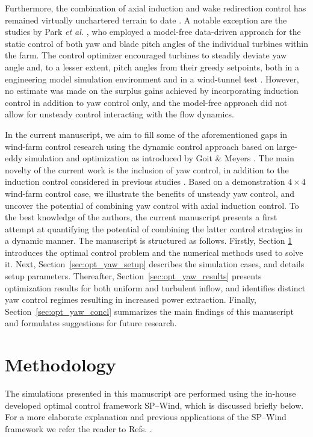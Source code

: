 \documentclass[energies,article,submit,moreauthors,latex,10pt,a4paper]{mdpi}
\newcommand{\revision}[1]{{\color{red} #1}}
\begin{document}
Furthermore, the combination of axial induction and wake redirection control has remained virtually unchartered terrain to date \cite{boersma2017tutorial}. A notable exception are the studies by Park \emph{et al.} \cite{park2015cooperative, park2017data}, who employed a model-free data-driven approach for the static control of both yaw and blade pitch angles of the individual turbines within the farm. The control optimizer encouraged turbines to steadily deviate yaw angle and, to a lesser extent, pitch angles from their greedy setpoints, both in a engineering model simulation environment \cite{park2015cooperative, park2016data} and in a wind-tunnel test \cite{park2017data}. However, no estimate was made on the surplus gains achieved by incorporating induction control in addition to yaw control only, and the model-free approach did not allow for unsteady control interacting with the flow dynamics. 

\revision{In the current manuscript, we aim to fill some of the aforementioned gaps in wind-farm control research using the dynamic control approach based on large-eddy simulation and optimization as introduced by Goit \& Meyers \cite{goit2015optimal}. The main novelty of the current work is the inclusion of yaw control, in addition to the induction control considered in previous studies \cite{goit2015optimal, goit2016optimal, munters2017optimal}.} 
Based on a demonstration $4 \times 4$ wind-farm control case, we illustrate the benefits of unsteady yaw control, and uncover the potential of combining yaw control with axial induction control. To the best knowledge of the authors, the current manuscript presents a first attempt at quantifying the potential of combining the latter control strategies in a dynamic manner. 
The manuscript is structured as follows. Firstly, Section \ref{sec:meth} introduces the optimal control problem and the numerical methods used to solve it. Next, Section~\ref{sec:opt_yaw_setup} describes the simulation cases, and details setup parameters. Thereafter, Section~\ref{sec:opt_yaw_results} presents optimization results for both uniform and turbulent inflow, and identifies distinct yaw control regimes resulting in increased power extraction. Finally, Section~\ref{sec:opt_yaw_concl} summarizes the main findings of this manuscript and formulates suggestions for future research. 

\section{Methodology}\label{sec:meth}
\noindent The simulations presented in this manuscript are performed using the in-house developed optimal control framework SP--Wind, which is discussed briefly below. For a more elaborate explanation and previous applications of the SP--Wind framework we refer the reader to Refs. \cite{delport2009constrained, goit2015optimal, nita2016efficiency, goit2016optimal, munters2017optimal}.  
\end{document}

